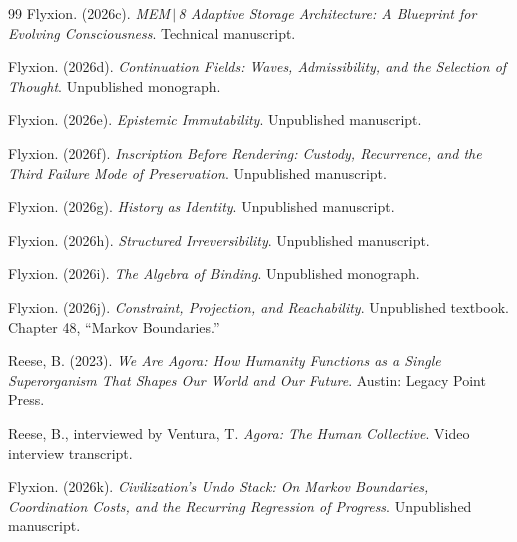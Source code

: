 \documentclass[11pt]{article}
\begin{document}
\begin{thebibliography}{99}
Flyxion. (2026c). \emph{MEM\,$|$\,8 Adaptive Storage Architecture: A Blueprint for Evolving Consciousness}. Technical manuscript.

Flyxion. (2026d). \emph{Continuation Fields: Waves, Admissibility, and the Selection of Thought}. Unpublished monograph.

Flyxion. (2026e). \emph{Epistemic Immutability}. Unpublished manuscript.

Flyxion. (2026f). \emph{Inscription Before Rendering: Custody, Recurrence, and the Third Failure Mode of Preservation}. Unpublished manuscript.

Flyxion. (2026g). \emph{History as Identity}. Unpublished manuscript.

Flyxion. (2026h). \emph{Structured Irreversibility}. Unpublished manuscript.

Flyxion. (2026i). \emph{The Algebra of Binding}. Unpublished monograph.

Flyxion. (2026j). \emph{Constraint, Projection, and Reachability}. Unpublished textbook. Chapter 48, ``Markov Boundaries.''

Reese, B. (2023). \emph{We Are Agora: How Humanity Functions as a Single Superorganism That Shapes Our World and Our Future}. Austin: Legacy Point Press.

Reese, B., interviewed by Ventura, T. \emph{Agora: The Human Collective}. Video interview transcript.

Flyxion. (2026k). \emph{Civilization's Undo Stack: On Markov Boundaries, Coordination Costs, and the Recurring Regression of Progress}. Unpublished manuscript.

\end{thebibliography}
\end{document}

